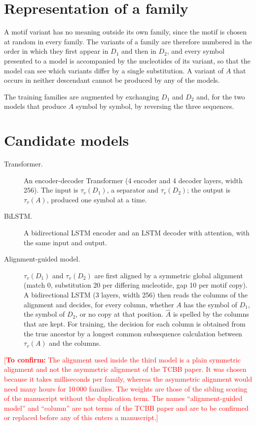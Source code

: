 \documentclass[11pt,a4paper]{article}
\newcommand{\todo}[1]{\textcolor{red}{[\textbf{To confirm:} #1]}}
\newcommand{\Ahat}{\hat{A}}
\begin{document}
\section{Representation of a family}

A motif variant has no meaning outside its own family, since the motif is chosen at random in every family. The variants of a family are therefore numbered in the order in which they first appear in $D_1$ and then in $D_2$, and every symbol presented to a model is accompanied by the nucleotides of its variant, so that the model can see which variants differ by a single substitution. A variant of $A$ that occurs in neither descendant cannot be produced by any of the models.

The training families are augmented by exchanging $D_1$ and $D_2$ and, for the two models that produce $A$ symbol by symbol, by reversing the three sequences.

\section{Candidate models}

\begin{description}
\item[Transformer.] An encoder-decoder Transformer (4 encoder and 4 decoder layers, width 256). The input is $\tau_v(D_1)$, a separator and $\tau_v(D_2)$; the output is $\tau_v(A)$, produced one symbol at a time.
\item[BiLSTM.] A bidirectional LSTM encoder and an LSTM decoder with attention, with the same input and output.
\item[Alignment-guided model.] $\tau_v(D_1)$ and $\tau_v(D_2)$ are first aligned by a symmetric global alignment (match 0, substitution 20 per differing nucleotide, gap 10 per motif copy). A bidirectional LSTM (3 layers, width 256) then reads the columns of the alignment and decides, for every column, whether $A$ has the symbol of $D_1$, the symbol of $D_2$, or no copy at that position. $\Ahat$ is spelled by the columns that are kept. For training, the decision for each column is obtained from the true ancestor by a longest common subsequence calculation between $\tau_v(A)$ and the columns.
\end{description}

\todo{The alignment used inside the third model is a plain symmetric alignment and not the asymmetric alignment of the TCBB paper. It was chosen because it takes milliseconds per family, whereas the asymmetric alignment would need many hours for 10\,000 families. The weights are those of the sibling scoring of the manuscript without the duplication term. The names ``alignment-guided model'' and ``column'' are not terms of the TCBB paper and are to be confirmed or replaced before any of this enters a manuscript.}
\end{document}
